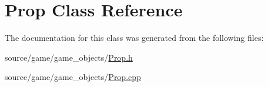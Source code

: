 \hypertarget{classProp}{
\section{Prop Class Reference}
\label{classProp}
}


The documentation for this class was generated from the following files:\begin{DoxyCompactItemize}
\item 
source/game/game\_\-objects/\hyperlink{Prop_8h}{Prop.h}\item 
source/game/game\_\-objects/\hyperlink{Prop_8cpp}{Prop.cpp}\end{DoxyCompactItemize}
